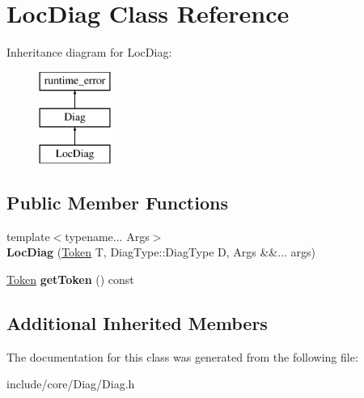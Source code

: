 \hypertarget{class_loc_diag}{}\section{Loc\+Diag Class Reference}
\label{class_loc_diag}
Inheritance diagram for Loc\+Diag\+:\begin{figure}[H]
\begin{center}
\leavevmode
\includegraphics[height=3.000000cm]{class_loc_diag}
\end{center}
\end{figure}
\subsection*{Public Member Functions}
\begin{DoxyCompactItemize}
\item 
\mbox{\label{class_loc_diag_aef22a5fc1df2f5b03e05af0c7b9d6eca}} 
{\footnotesize template$<$typename... Args$>$ }\\{\bfseries Loc\+Diag} (\mbox{\hyperlink{class_token}{Token}} T, Diag\+Type\+::\+Diag\+Type D, Args \&\&... args)
\item 
\mbox{\label{class_loc_diag_a9ac35136b861a7da6eeea2f93ed4154c}} 
\mbox{\hyperlink{class_token}{Token}} {\bfseries get\+Token} () const
\end{DoxyCompactItemize}
\subsection*{Additional Inherited Members}


The documentation for this class was generated from the following file\+:\begin{DoxyCompactItemize}
\item 
include/core/\+Diag/Diag.\+h\end{DoxyCompactItemize}
